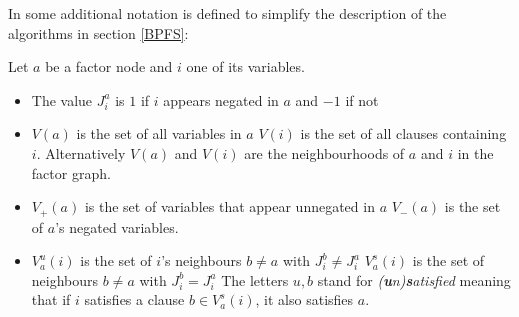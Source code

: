 In \cite{survprob} some additional notation is defined to simplify the description of the algorithms in section \ref{BPFS}: 
\newpage
\begin{definition} Let $a$ be a factor node and $i$ one of its variables.
\begin{itemize}
\item The value $J_i^a$ is $1$ if $i$ appears negated in $a$ and $-1$ if not
\item $V(a)$ is the set of all variables in $a$ \newline$V(i)$ is the set of all clauses containing $i$.  \newline Alternatively $V(a)$ and $V(i)$ are the neighbourhoods of $a$ and $i$ in the factor graph.
\item $V_+(a)$ is the set of variables that appear unnegated in $a$ \newline $V_-(a)$ is the set of $a$'s negated variables.
\item $V_a^u(i)$ is the set of $i$'s neighbours $b \neq a$ with $J_i^b \neq J_i^a$ \newline $V_a^s(i)$ is the set of neighbours $b \neq a$ with $J_i^b = J_i^a$\newline
The letters $u, b$ stand for \emph{(\textbf{u}n)\textbf{s}atisfied} meaning that if $i$ satisfies a clause $b \in V_a^s(i)$, it also satisfies $a$.
\end{itemize}
\end{definition}


